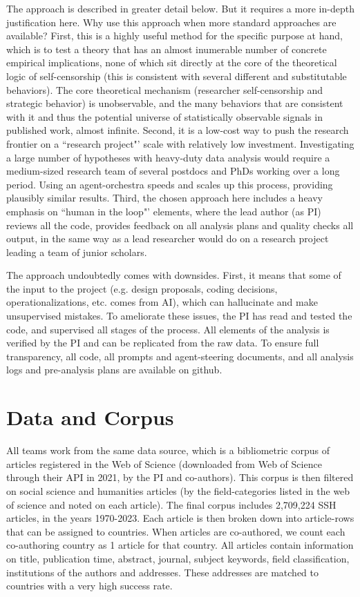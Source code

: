 \documentclass[12pt,a4paper]{article}
\begin{document}
The approach is described in greater detail below. But it requires a more in-depth justification here. Why use this approach when more standard approaches are available? First, this is a highly useful method for the specific purpose at hand, which is to test a theory that has an almost inumerable number of concrete empirical implications, none of which sit directly at the core of the theoretical logic of self-censorship (this is consistent with several different and substitutable behaviors). The core theoretical mechanism (researcher self-censorship and strategic behavior) is unobservable, and the many behaviors that are consistent with it and thus the potential universe of statistically observable signals in published work, almost infinite. Second, it is a low-cost way to push the research frontier on a ``research project"' scale with relatively low investment. Investigating a large number of hypotheses with heavy-duty data analysis would require a medium-sized research team of several postdocs and PhDs working over a long period. Using an agent-orchestra speeds and scales up this process, providing plausibly similar results. Third, the chosen approach here includes a heavy emphasis on ``human in the loop"' elements, where the lead author (as PI) reviews all the code, provides feedback on all analysis plans and quality checks all output, in the same way as a lead researcher would do on a research project leading a team of junior scholars. 

The approach undoubtedly comes with downsides. First, it means that some of the input to the project (e.g. design proposals, coding decisions, operationalizations, etc. comes from AI), which can hallucinate and make unsupervised mistakes. To ameliorate these issues, the PI has read and tested the code, and supervised all stages of the process. All elements of the analysis is verified by the PI and can be replicated from the raw data. To ensure full transparency, all code, all prompts and agent-steering documents, and all analysis logs and pre-analysis plans are available on github. 


\section{Data and Corpus}
\label{sec:data}
All teams work from the same data source, which is a bibliometric corpus of articles registered in the Web of Science (downloaded from Web of Science through their API in 2021, by the PI and co-authors). This corpus is then filtered on social science and humanities articles (by the field-categories listed in the web of science and noted on each article). The final corpus includes 2,709,224 SSH articles, in the years 1970-2023. Each article is then broken down into article-rows that can be assigned to countries. When articles are co-authored, we count each co-authoring country as 1 article for that country. All articles contain information on title, publication time, abstract, journal, subject keywords, field classification, institutions of the authors and addresses. These addresses are matched to countries with a very high success rate. 
\end{document}
